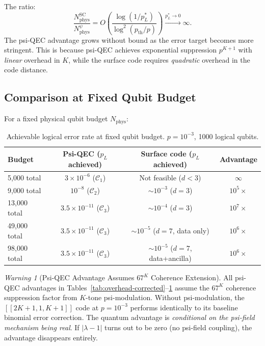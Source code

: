 \documentclass[11pt]{article}
\theoremstyle{definition}
\theoremstyle{remark}
\newtheorem{warning}[theorem]{Warning}
\begin{document}
The ratio:
\begin{equation}
  \frac{N_{\mathrm{phys}}^{\mathrm{SC}}}{N_{\mathrm{phys}}^{\psi}}
  = O\!\left(\frac{\log(1/p_L^*)}{\log^2(p_{\mathrm{th}}/p)}\right)
  \xrightarrow{p_L^* \to 0} \infty.
  \label{eq:advantage-scaling}
\end{equation}
The psi-QEC advantage grows without bound as the error target becomes more
stringent.  This is because psi-QEC achieves exponential suppression
$p^{K+1}$ with \emph{linear} overhead in $K$, while the surface code
requires \emph{quadratic} overhead in the code distance.

\subsection{Comparison at Fixed Qubit Budget}
\label{sec:fixed-budget}

For a fixed physical qubit budget $N_{\mathrm{phys}}$:

\begin{table}[h]
\centering
\caption{Achievable logical error rate at fixed qubit budget.
  $p = 10^{-3}$, 1000 logical qubits.}
\label{tab:fixed-budget}
\begin{tabular}{@{}lccc@{}}
\toprule
Budget & Psi-QEC ($p_L$ achieved) & Surface code ($p_L$ achieved) & Advantage \\
\midrule
5,000 total & $3\times10^{-6}$ ($\mathcal{C}_1$) & Not feasible ($d < 3$) & $\infty$ \\
9,000 total & $10^{-8}$ ($\mathcal{C}_2$) & $\sim10^{-3}$ ($d=3$) & $10^{5}\times$ \\
13,000 total & $3.5\times10^{-11}$ ($\mathcal{C}_3$) & $\sim10^{-4}$ ($d=3$) & $10^{7}\times$ \\
49,000 total & $3.5\times10^{-11}$ ($\mathcal{C}_3$) & $\sim10^{-5}$ ($d=7$, data only) & $10^{6}\times$ \\
98,000 total & $3.5\times10^{-11}$ ($\mathcal{C}_3$) & $\sim10^{-5}$ ($d=7$, data+ancilla) & $10^{6}\times$ \\
\bottomrule
\end{tabular}
\end{table}

\begin{warning}[Psi-QEC Advantage Assumes $67^K$ Coherence Extension]
\label{warn:assumes-psi}
All psi-QEC advantages in Tables~\ref{tab:overhead-corrected}--\ref{tab:fixed-budget}
assume the $67^K$ coherence suppression factor from $K$-tone psi-modulation.
Without psi-modulation, the $[[2K+1,1,K+1]]$ code at $p = 10^{-3}$ performs
identically to its baseline binomial error correction.  The quantum advantage
is \emph{conditional on the psi-field mechanism being real}.  If $|\lambda-1|$
turns out to be zero (no psi-field coupling), the advantage disappears entirely.
\end{warning}
\end{document}
